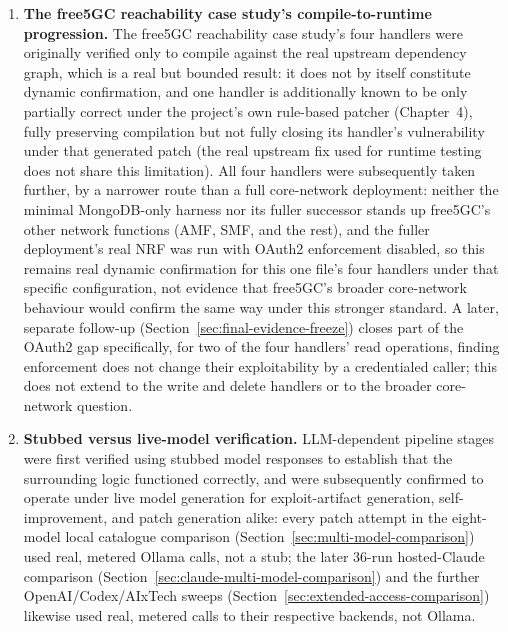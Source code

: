 \documentclass[12pt,a4paper]{report}
\begin{document}
\begin{enumerate}
\item \textbf{The free5GC reachability case study's compile-to-runtime progression.} The free5GC reachability case study's four handlers were originally verified only to compile against the real upstream dependency graph, which is a real but bounded result: it does not by itself constitute dynamic confirmation, and one handler is additionally known to be only partially correct under the project's own rule-based patcher (Chapter~4), fully preserving compilation but not fully closing its handler's vulnerability under that generated patch (the real upstream fix used for runtime testing does not share this limitation). All four handlers were subsequently taken further, by a narrower route than a full core-network deployment: neither the minimal MongoDB-only harness nor its fuller successor stands up free5GC's other network functions (AMF, SMF, and the rest), and the fuller deployment's real NRF was run with OAuth2 enforcement disabled, so this remains real dynamic confirmation for this one file's four handlers under that specific configuration, not evidence that free5GC's broader core-network behaviour would confirm the same way under this stronger standard. A later, separate follow-up (Section~\ref{sec:final-evidence-freeze}) closes part of the OAuth2 gap specifically, for two of the four handlers' read operations, finding enforcement does not change their exploitability by a credentialed caller; this does not extend to the write and delete handlers or to the broader core-network question.

\item \textbf{Stubbed versus live-model verification.} LLM-dependent pipeline stages were first verified using stubbed model responses to establish that the surrounding logic functioned correctly, and were subsequently confirmed to operate under live model generation for exploit-artifact generation, self-improvement, and patch generation alike: every patch attempt in the eight-model local catalogue comparison (Section~\ref{sec:multi-model-comparison}) used real, metered Ollama calls, not a stub; the later 36-run hosted-Claude comparison (Section~\ref{sec:claude-multi-model-comparison}) and the further OpenAI/Codex/AIxTech sweeps (Section~\ref{sec:extended-access-comparison}) likewise used real, metered calls to their respective backends, not Ollama.


\end{enumerate}
\end{document}
